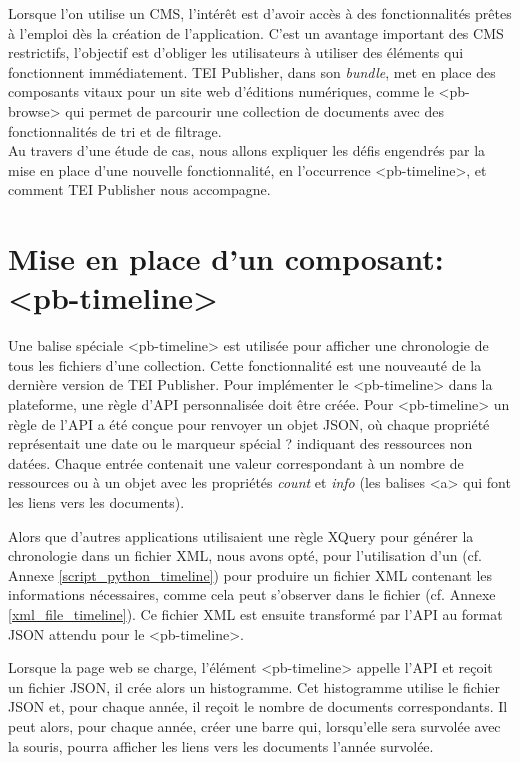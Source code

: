 Lorsque l'on utilise un CMS, l'intérêt est d'avoir accès à des fonctionnalités prêtes à l'emploi dès la création de l'application. C'est un avantage important des CMS restrictifs, l'objectif est d'obliger les utilisateurs à utiliser des éléments qui fonctionnent immédiatement. TEI Publisher, dans son \textit{bundle}, met en place des composants vitaux pour un site web d'éditions numériques, comme le <pb-browse> qui permet de parcourir une collection de documents avec des fonctionnalités de tri et de filtrage.\\

Au travers d'une étude de cas, nous allons expliquer les défis engendrés par la mise en place d'une nouvelle fonctionnalité, en l'occurrence <pb-timeline>, et comment TEI Publisher nous accompagne.

\section{Mise en place d'un composant: <pb-timeline>}

Une balise spéciale <pb-timeline> est utilisée pour afficher une chronologie de tous les fichiers d'une collection. Cette fonctionnalité est une nouveauté de la dernière version de TEI Publisher. Pour implémenter le <pb-timeline> dans la plateforme, une règle d'API personnalisée doit être créée. Pour <pb-timeline> un règle de l'API a été conçue pour renvoyer un objet JSON, où chaque propriété représentait une date ou le marqueur spécial \og{}?\fg{} indiquant des ressources non datées. Chaque entrée contenait une valeur correspondant à un nombre de ressources ou à un objet avec les propriétés \textit{count} et \textit{info} (les balises <a> qui font les liens vers les documents).

Alors que d'autres applications utilisaient une règle XQuery pour générer la chronologie dans un fichier XML, nous avons opté, pour l'utilisation d'un (cf. Annexe \ref{script_python_timeline}) pour produire un fichier XML contenant les informations nécessaires, comme cela peut s’observer dans le fichier (cf. Annexe \ref{xml_file_timeline}). Ce fichier XML est ensuite transformé par l'API au format JSON attendu pour le <pb-timeline>.

Lorsque la page web se charge, l'élément <pb-timeline> appelle l'API et reçoit un fichier JSON, il crée alors un histogramme. Cet histogramme utilise le fichier JSON et, pour chaque année, il reçoit le nombre de documents correspondants. Il peut alors, pour chaque année, créer une barre qui, lorsqu'elle sera survolée avec la souris, pourra afficher les liens vers les documents l'année survolée.

